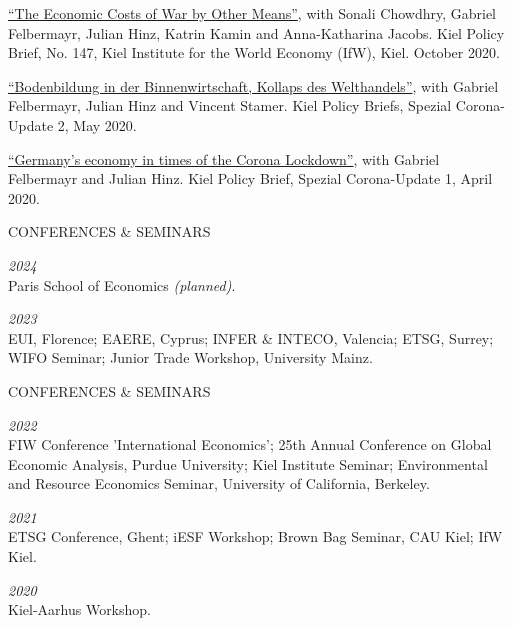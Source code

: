 \documentclass{article}
\begin{document}
\begin{minipage}[t]{0.8\textwidth}
    \href{https://www.ifw-kiel.de/publications/kiel-policy-briefs/2020/the-economic-costs-of-war-by-other-means-15301/}{``The Economic Costs of War by Other Means''}, with Sonali Chowdhry, Gabriel Felbermayr, Julian Hinz, Katrin Kamin and Anna-Katharina Jacobs. Kiel Policy Brief, No. 147, Kiel Institute for the World Economy (IfW), Kiel. October 2020. \par
    \href{https://www.ifw-kiel.de/de/publikationen/kiel-policy-briefs/spezial/bodenbildung-in-der-binnenwirtschaft-kollaps-des-welthandels-14242/}{``Bodenbildung in der Binnenwirtschaft, Kollaps des Welthandels''}, with Gabriel Felbermayr, Julian Hinz and Vincent Stamer. Kiel Policy Briefs, Spezial Corona-Update 2, May 2020. \par
    \href{https://www.ifw-kiel.de/publications/kiel-policy-briefs/special-edition/germanys-economy-in-times-of-the-corona-lockdown-14127/}{``Germany’s economy in times of the Corona Lockdown''}, with Gabriel Felbermayr and Julian Hinz. Kiel Policy Brief, Spezial Corona-Update 1, April 2020.
\end{minipage}
\medskip


\begin{minipage}[t]{0.12\textwidth}
    {\selectfont CONFERENCES \& SEMINARS} \\
\end{minipage}
\hspace{5mm}
\begin{minipage}[t]{0.8\textwidth}
    \textit{2024} \\
    Paris School of Economics \textit{(planned)}. \par
    \textit{2023} \\
    EUI, Florence; EAERE, Cyprus; INFER \& INTECO, Valencia; ETSG, Surrey; WIFO Seminar; Junior Trade Workshop, University Mainz. \par
\end{minipage}
\medskip

\begin{minipage}[t]{0.12\textwidth}
    {\selectfont CONFERENCES \& SEMINARS} \\
\end{minipage}
\hspace{5mm}
\begin{minipage}[t]{0.8\textwidth}
    \textit{2022} \\
    FIW Conference 'International Economics'; 25th Annual Conference on Global Economic Analysis, Purdue University; Kiel Institute Seminar; Environmental and Resource Economics Seminar, University of California, Berkeley.  \par
    \textit{2021} \\
    ETSG Conference, Ghent; iESF Workshop; Brown Bag Seminar, CAU Kiel; IfW Kiel. \par
    \textit{2020} \\
    Kiel-Aarhus Workshop. \par
\end{minipage}
\medskip
\end{document}
